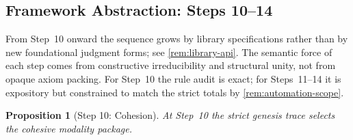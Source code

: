 \documentclass[11pt,a4paper]{article}
\theoremstyle{plain}
\newtheorem{proposition}[theorem]{Proposition}
\theoremstyle{definition}
\theoremstyle{remark}
\begin{document}
\subsection{Framework Abstraction: Steps 10--14}
\label{subsec:genesis-framework-proof}

From Step~10 onward the sequence grows by library specifications rather than by
new foundational judgment forms; see \cref{rem:library-api}.
The semantic force of each step comes from constructive irreducibility and
structural unity, not from opaque axiom packing.
For Step~10 the rule audit is exact; for Steps~11--14 it is expository but
constrained to match the strict totals by \cref{rem:automation-scope}.

\begin{proposition}[Step 10: Cohesion]
\label{prop:genesis-step10}
At Step~10 the strict genesis trace selects the cohesive modality package.
\end{proposition}
\end{document}
